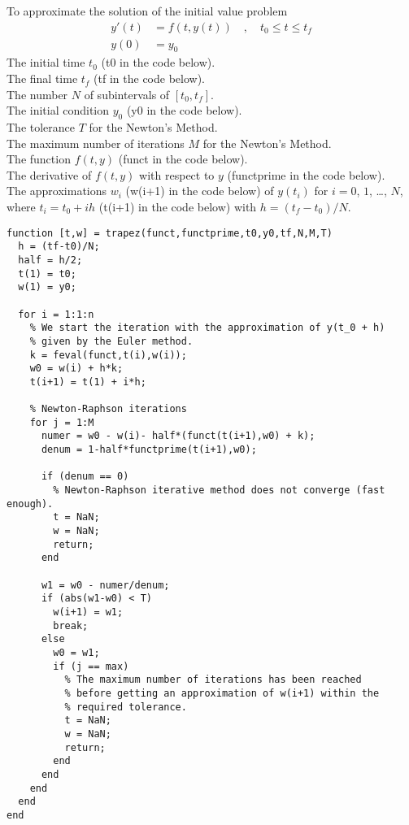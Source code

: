 \begin{code}
To approximate the solution of the initial value problem
\[
\begin{split}
y'(t) &= f(t,y(t)) \quad , \quad t_0 \leq t \leq t_f \\
y(0) &= y_0
\end{split}
\]
 The initial time $t_0$ (t0 in the code below).\\
The final time $t_f$ (tf in the code below).\\
The number $N$ of subintervals of $[t_0,t_f]$.\\
The initial condition $y_0$ (y0 in the code below).\\
The tolerance $T$ for the Newton's Method.\\
The maximum number of iterations $M$ for the Newton's Method.\\
The function $f(t,y)$ (funct in the code below).\\
The derivative of $f(t,y)$ with respect to $y$ (functprime in the code
below).\\
 The approximations $w_i$ (w(i+1) in the code below)
of $y(t_i)$ for $i=0$, $1$, \ldots, $N$, where $t_i=t_0+ih$
(t(i+1) in the code below) with $h=(t_f-t_0)/N$.
\small
\begin{verbatim}
function [t,w] = trapez(funct,functprime,t0,y0,tf,N,M,T)
  h = (tf-t0)/N;
  half = h/2;
  t(1) = t0;
  w(1) = y0;

  for i = 1:1:n
    % We start the iteration with the approximation of y(t_0 + h)
    % given by the Euler method.
    k = feval(funct,t(i),w(i));
    w0 = w(i) + h*k;
    t(i+1) = t(1) + i*h;

    % Newton-Raphson iterations
    for j = 1:M
      numer = w0 - w(i)- half*(funct(t(i+1),w0) + k);
      denum = 1-half*functprime(t(i+1),w0);

      if (denum == 0)
        % Newton-Raphson iterative method does not converge (fast enough).
        t = NaN;
        w = NaN;
        return;
      end

      w1 = w0 - numer/denum;
      if (abs(w1-w0) < T)
        w(i+1) = w1;
        break;
      else
        w0 = w1;
        if (j == max)
          % The maximum number of iterations has been reached
          % before getting an approximation of w(i+1) within the
          % required tolerance.
          t = NaN;
          w = NaN;
          return;
        end
      end
    end
  end
end
\end{verbatim}
\end{code}

